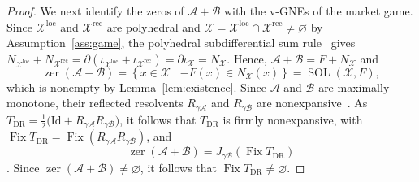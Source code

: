 \documentclass[final]{l4dc2026}
\begin{document}
\begin{proof}
We next identify the zeros of $\mathcal A+\mathcal B$ with the v-GNEs of the market game. Since $\mathcal X^{\mathrm{loc}}$ and $\mathcal X^{\mathrm{rec}}$ are polyhedral and $\mathcal X=\mathcal X^{\mathrm{loc}}\cap\mathcal X^{\mathrm{rec}}\neq\varnothing$ by Assumption~\ref{ass:game}, the polyhedral subdifferential sum rule~\citep[Thm.~16.47(iii)]{bauschke2017convex} gives $N_{\mathcal X^{\mathrm{loc}}}+N_{\mathcal X^{\mathrm{rec}}}=\partial(\iota_{\mathcal X^{\mathrm{loc}}}+\iota_{\mathcal X^{\mathrm{rec}}})=\partial\iota_{\mathcal X}=N_{\mathcal X}$. Hence, $\mathcal A+\mathcal B=F+N_{\mathcal X}$ and
\begin{equation}
    \operatorname{zer}(\mathcal A+\mathcal B)
    =
    \left\{
        x\in\mathcal X
        \mid
        -F(x)\in N_{\mathcal X}(x)
    \right\}
    =
    \operatorname{SOL}(\mathcal X,F),
    \label{eq:zero-vgne}
\end{equation}
which is nonempty by Lemma~\ref{lem:existence}. Since $\mathcal A$ and $\mathcal B$ are maximally monotone, their reflected resolvents $R_{\gamma\mathcal A}$ and $R_{\gamma\mathcal B}$ are nonexpansive~\citep[Cor.~23.11]{bauschke2017convex}. As $T_{\mathrm{DR}}=\tfrac12\big(\mathrm{Id}+R_{\gamma\mathcal A}R_{\gamma\mathcal B}\big)$, it follows that $T_{\mathrm{DR}}$ is firmly nonexpansive, with $\operatorname{Fix}T_{\mathrm{DR}}=\operatorname{Fix}(R_{\gamma\mathcal A}R_{\gamma\mathcal B})$, and
\begin{equation}
    \operatorname{zer}(\mathcal A+\mathcal B)
    =
    J_{\gamma\mathcal B}
    \left(
        \operatorname{Fix}T_{\mathrm{DR}}
    \right)
    \label{eq:shadow-characterization}
\end{equation}
\citep[Prop.~26.1(iii)]{bauschke2017convex}. Since $\operatorname{zer}(\mathcal A+\mathcal B)\neq\varnothing$,
it follows that
$\operatorname{Fix}T_{\mathrm{DR}}\neq\varnothing$.


\end{proof}
\end{document}
